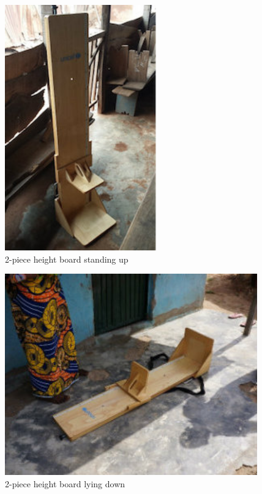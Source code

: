\documentclass[12pt,]{book}
\theoremstyle{definition}
\theoremstyle{definition}
\theoremstyle{definition}
\theoremstyle{remark}
\begin{document}
\begin{figure}

{\centering \includegraphics[width=2.57in]{images/heightBoard01} 

}

\caption{2-piece height board standing up}\label{fig:height01}
\end{figure}

\begin{figure}

{\centering \includegraphics[width=4.29in]{images/heightBoard02} 

}

\caption{2-piece height board lying down}\label{fig:height02}
\end{figure}
\end{document}
